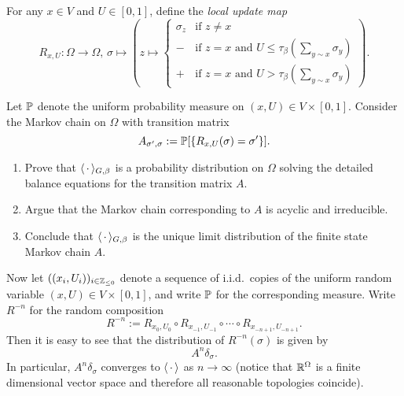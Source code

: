 \begin{definition}
    For any $x\in V$ and $U\in[0,1]$, define the \emph{local update map}
    \[
        R_{x,U}:\Omega\to\Omega,\,\sigma\mapsto
        \left(
            z\mapsto \begin{cases}
                \sigma_z&\text{if $z\neq x$}\\
                - &\text{if $z=x$ and $U\leq \tau_\beta(\sum_{y\sim x}\sigma_y)$}\\
                + &\text{if $z=x$ and $U>\tau_\beta(\sum_{y\sim x}\sigma_y)$}
            \end{cases} 
        \right).
    \]
\end{definition}

Let $\P$ denote the uniform probability measure on $(x,U)\in V\times[0,1]$.
Consider the Markov chain on $\Omega$ with transition matrix
\[
    A_{\sigma',\sigma}:=\P[\{R_{x,U}(\sigma)=\sigma'\}].
\]

\begin{exercise}
    \begin{enumerate}
        \item     Prove that $\langle\blank\rangle_{G,\beta}$ is a probability distribution on
        $\Omega$ solving the detailed balance equations for the transition matrix $A$.
        \item Argue that the Markov chain corresponding to $A$ is acyclic and irreducible.
        \item Conclude that $\langle\blank\rangle_{G,\beta}$ is the unique limit distribution
        of the finite state Markov chain $A$.
    \end{enumerate}
\end{exercise}

Now let $((x_i,U_i))_{i\in\Z_{\leq 0}}$ denote a sequence of i.i.d.\ copies of
the uniform random variable $(x,U)\in V\times[0,1]$,
and write $\P$ for the corresponding measure.
Write $R^{-n}$ for the random composition
\[
    R^{-n}:=R_{x_0,U_0}\circ R_{x_{-1},U_{-1}}\circ\cdots\circ R_{x_{-n+1},U_{-n+1}}.
\]
Then it is easy to see that the distribution of $R^{-n}(\sigma)$
is given by
\[
    A^n\delta_\sigma.
\]
In particular, $A^n\delta_\sigma$ converges to $\langle\blank\rangle$ as $n\to\infty$
(notice that $\R^\Omega$ is a finite dimensional vector space and therefore all reasonable topologies coincide).

